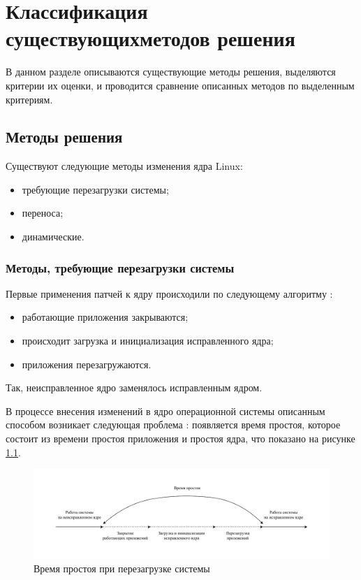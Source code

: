 \chapter{Классификация существующих\newline методов решения}

В данном разделе описываются существующие методы решения, выделяются критерии их оценки, и проводится сравнение описанных методов по выделенным критериям.

\section{Методы решения}

Существуют следующие методы изменения ядра Linux:

\begin{itemize}
	\item требующие перезагрузки системы;
	\item переноса;
	\item динамические.
\end{itemize}

\subsection{Методы, требующие перезагрузки системы}

Первые применения патчей к ядру происходили по следующему алгоритму \cite{dwarf}:

\begin{itemize}
	\item работающие приложения закрываются;
	\item происходит загрузка и инициализация исправленного ядра;
	\item приложения перезагружаются.
\end{itemize}

Так, неисправленное ядро заменялось исправленным ядром. 

В процессе внесения изменений в ядро операционной системы описанным способом возникает следующая проблема \cite{seamless}: появляется время простоя, которое состоит из времени простоя приложения и простоя ядра, что показано на рисунке \ref{img:downtime}.

\begin{figure}[H]
	\begin{center}
		\includegraphics[scale=0.7]{img/downtime.pdf}
	\end{center}
	\captionsetup{justification=centering}
	\caption{Время простоя при перезагрузке системы}
	\label{img:downtime}
\end{figure}

